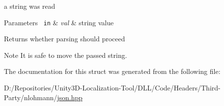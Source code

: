 a string was read 


\begin{DoxyParams}[1]{Parameters}
\mbox{\texttt{ in}}  & {\em val} & string value \\
\hline
\end{DoxyParams}
\begin{DoxyReturn}{Returns}
whether parsing should proceed 
\end{DoxyReturn}
\begin{DoxyNote}{Note}
It is safe to move the passed string. 
\end{DoxyNote}


The documentation for this struct was generated from the following file\+:\begin{DoxyCompactItemize}
\item 
D\+:/\+Repositories/\+Unity3\+D-\/\+Localization-\/\+Tool/\+D\+L\+L/\+Code/\+Headers/\+Third-\/\+Party/nlohmann/\mbox{\hyperlink{json_8hpp}{json.\+hpp}}\end{DoxyCompactItemize}
